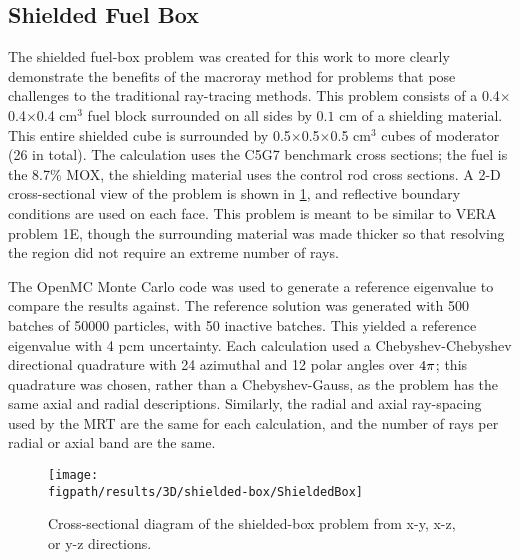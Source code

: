 {{    \subsection{Shielded Fuel Box}{\label{ssec:MR:Shielded Fuel Box}
      The shielded fuel-box problem was created for this work to more clearly demonstrate the benefits of the macroray method for problems that pose challenges to the traditional ray-tracing methods.
      This problem consists of a 0.4$\times$0.4$\times$0.4 cm$^3$ fuel block surrounded on all sides by $0.1$ cm of a shielding material.
      This entire shielded cube is surrounded by 0.5$\times$0.5$\times$0.5 cm$^3$ cubes of moderator (26 in total).
      The calculation uses the C5G7 benchmark cross sections; the fuel is the 8.7\% \ac{MOX}, the shielding material uses the control rod cross sections.
      A 2-D cross-sectional view of the problem is shown in \cref{fig:MR:Shielded-Box Diagram}, and reflective boundary conditions are used on each face.
      This problem is meant to be similar to \ac{VERA} problem 1E, though the surrounding material was made thicker so that resolving the region did not require an extreme number of rays.

      The OpenMC Monte Carlo code \cite{OpenMC} was used to generate a reference eigenvalue to compare the results against.
      The reference solution was generated with 500 batches of 50000 particles, with 50 inactive batches.
      This yielded a reference eigenvalue with 4 pcm uncertainty.
      Each calculation used a Chebyshev-Chebyshev directional quadrature with 24 azimuthal and 12 polar angles over $4\pi$;
        this quadrature was chosen, rather than a Chebyshev-Gauss, as the problem has the same axial and radial descriptions.
      Similarly, the radial and axial ray-spacing used by the \ac{MRT} are the same for each calculation, and the number of rays per radial or axial band are the same.

      \begin{figure}[h]
        \centering
        \texttt{[image: \\figpath/results/3D/shielded-box/ShieldedBox]}
        \caption{Cross-sectional diagram of the shielded-box problem from x-y, x-z, or y-z directions. \label{fig:MR:Shielded-Box Diagram}}
      \end{figure}

}}}
